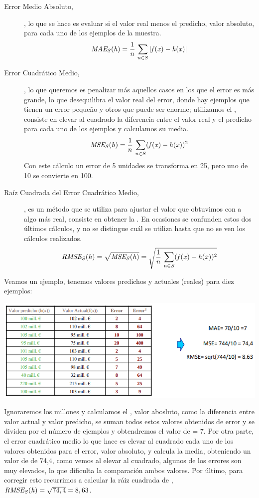 \begin{description}
    \item[Error Medio Absoluto, ], lo que se hace es evaluar si el valor real menos el predicho, valor absoluto, para cada uno de los ejemplos de la muestra.
    $$\mathit{MAE_S(h)}  = \frac{1}{n}\,\sum_{n\in S}|\mathit{f(x)}  - \mathit{h(x)} |$$
    \item[Error Cuadrático Medio,  ],  lo que queremos es penalizar más aquellos casos en los que el error es más grande, lo que desequilibra el valor real del error, donde hay ejemplos que tienen un error pequeño y otros que puede ser enorme; utilizamos el , consiste en elevar al cuadrado la diferencia entre el valor real y el predicho para cada uno de los ejemplos y calculamos su media.
    $$\mathit{MSE_S(h)}  = \frac{1}{n}\,\sum_{n\in S}(\mathit{f(x)}  - \mathit{h(x)} )^2$$
    Con este cálculo un error de 5 unidades se transforma en 25, pero uno de 10 se convierte en 100.
    \item[Raíz Cuadrada del Error Cuadrático Medio, ] , es un método que se utiliza para ajustar el valor que obtuvimos con  a algo más real, consiste en obtener la . En ocasiones se confunden estos dos últimos cálculos, y no se distingue cuál se utiliza hasta que no se ven los cálculos realizados.
    $$\mathit{RMSE_S(h)}  = \sqrt{\mathit{MSE_S(h)} } = \sqrt{ \frac{1}{n}\,\sum_{n\in S}(\mathit{f(x)}  - \mathit{h(x)} )^2 }$$
\end{description}

Veamos un ejemplo, tenemos valores predichos y actuales (reales) para diez ejemplos:
\begin{center}
    \includegraphics[scale=.65]{images/mod02-03.png}
\end{center}

Ignoraremos los millones y calculamos el , valor abosluto, como la diferencia entre valor actual y valor predicho, se suman todos estos valores obtenidos de error y se dividen por el número de ejemplos y obtendremos el valor de  = 7. Por otra parte, el error cuadrático medio lo que hace es elevar al cuadrado cada uno de los valores obtenidos para el error, valor absoluto, y calcula la media, obteniendo un valor de  de 74,4, como vemos al elevar al cuadrado, algunos de los errores son muy elevados, lo que dificulta la comparación ambos valores. Por último, para corregir esto recurrimos a calcular la ráiz cuadrada de , $\mathit{RMSE_S(h)}  = \sqrt{74,4} = 8,63$.

